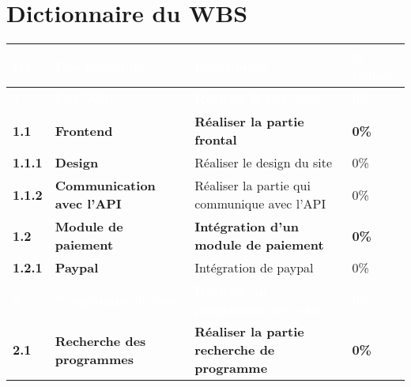 \section{Dictionnaire du WBS}
\footnotesize
\begin{supertabular}{|p{1.5cm} p{6cm}|p{5cm}|R{2cm}|}
  \hline
  \textcolor{white}{\textbf{ID}} & \textcolor{white}{\textbf{Fonctionnalité}} & \textcolor{white}{\textbf{Description}} & \textcolor{white}{\textbf{\% réalisé}} \\
  \hline
  \hline


  \textcolor{white}{\textbf{1}} & \textcolor{white}{\textbf{Site Web}} & \textcolor{white}{\textbf{Réaliser le site web}} & \textcolor{white}{\textbf{0\%}} \\
  \hline

  \textbf{1.1}  & \textbf{Frontend} & \textbf{Réaliser la partie frontal} & \textbf{0\%} \\
  \hline

  \hspace{6pt}
  \textbf{1.1.1}  & \textbf{Design} & Réaliser le design du site & 0\% \\
  \hline

  \hspace{6pt}
  \textbf{1.1.2}  & \textbf{Communication avec l'API} & Réaliser la partie qui communique avec l'API & 0\% \\
  \hline


  \textbf{1.2}  & \textbf{Module de paiement} & \textbf{Intégration d'un module de paiement} & \textbf{0\%} \\
  \hline

  \hspace{6pt} \textbf{1.2.1}  & \textbf{Paypal} & Intégration de paypal & 0\% \\
  \hline




  \textcolor{white}{\textbf{2}}  & \textcolor{white}{\textbf{Programme de scan}} & \textcolor{white}{\textbf{Réaliser un programme de scan}} & \textcolor{white}{\textbf{0\%}} \\
  \hline

  \textbf{2.1}  & \textbf{Recherche des programmes} & \textbf{Réaliser la partie recherche de programme} & \textbf{0\%} \\
  \hline


\end{supertabular}
